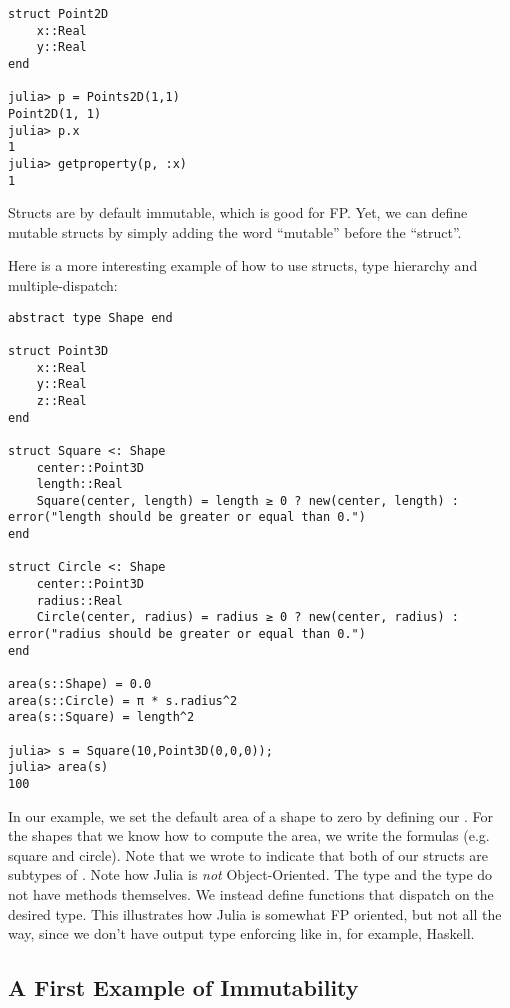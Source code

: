 \begin{lstlisting}[language=JuliaLocal, style=julia, texcl=true]
struct Point2D
    x::Real
    y::Real
end

julia> p = Points2D(1,1)
Point2D(1, 1)
julia> p.x
1
julia> getproperty(p, :x)
1
\end{lstlisting}

Structs are by default immutable, which is good for FP. Yet, we can define mutable structs by simply
adding the word ``mutable'' before the ``struct''.

Here is a more interesting example of how to use structs, type hierarchy and multiple-dispatch:

\begin{lstlisting}[language=JuliaLocal, style=julia, texcl=true]
abstract type Shape end

struct Point3D
    x::Real
    y::Real
    z::Real
end

struct Square <: Shape
    center::Point3D
    length::Real
    Square(center, length) = length ≥ 0 ? new(center, length) : error("length should be greater or equal than 0.")
end

struct Circle <: Shape
    center::Point3D
    radius::Real
    Circle(center, radius) = radius ≥ 0 ? new(center, radius) : error("radius should be greater or equal than 0.")
end

area(s::Shape) = 0.0
area(s::Circle) = π * s.radius^2
area(s::Square) = length^2

julia> s = Square(10,Point3D(0,0,0));
julia> area(s)
100
\end{lstlisting}
In our example, we set the default area of a shape to zero by defining our . For the
shapes that we know how to compute the area, we write the formulas (e.g. square and circle). Note that
we wrote  to indicate that both of our structs are subtypes of .
Note how Julia is \textit{not} Object-Oriented. The type  and the type 
do not have methods themselves. We instead define functions that dispatch on the desired type.
This illustrates how Julia is somewhat FP oriented, but not all the way, since we don't have
output type enforcing like in, for example, Haskell.


\subsection{A First Example of Immutability}

